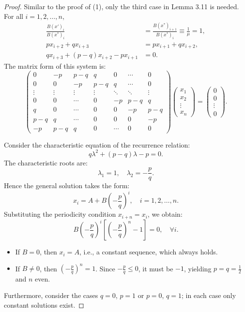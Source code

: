 \documentclass[a4paper,fleqn,numbers]{cas-sc}
\begin{document}
\begin{proof}
		Similar to the proof of (1), only the third case in Lemma 3.11 is needed. For all \(i=1,2,\ldots,n\),
		\begin{align*}
			\frac{B(x')_i}{B(x^*)_i}&=\frac{B(x^*)_{i+1}}{B(x^*)_i}\equiv\frac{1}{\mu}=1,\\
			p x_{i+2}+q x_{i+3}&=p x_{i+1}+q x_{i+2},\\
			q x_{i+3}+(p-q)x_{i+2}-p x_{i+1}&=0.
		\end{align*}
		The matrix form of this system is:
		\[
		\begin{pmatrix}
			0 & -p & p-q & q & 0 & \cdots & 0 \\
			0 & 0 & -p & p-q & q & \cdots & 0 \\
			\vdots & \vdots & \vdots & \vdots & \ddots & \ddots & \vdots \\
			0 & 0 & \cdots & 0 & -p & p-q & q \\
			q & 0 & \cdots & 0 & 0 & -p & p-q \\
			p-q & q & \cdots & 0 & 0 & 0 & -p \\
			-p & p-q & q & 0 & \cdots & 0 & 0
		\end{pmatrix}
		\begin{pmatrix}
			x_1 \\ x_2 \\ \vdots \\ x_n
		\end{pmatrix}
		=
		\begin{pmatrix}
			0 \\ 0 \\ \vdots \\ 0
		\end{pmatrix}.
		\]
		
		Consider the characteristic equation of the recurrence relation:
		\[
		q \lambda^2 + (p-q) \lambda - p = 0.
		\]
		The characteristic roots are:
		\[
		\lambda_1 = 1, \quad \lambda_2 = -\frac{p}{q}.
		\]
		Hence the general solution takes the form:
		\[
		x_i = A + B \left( -\frac{p}{q} \right)^i, \quad i=1,2,\ldots,n.
		\]
		Substituting the periodicity condition \(x_{i+n}=x_i\), we obtain:
		\[
		B \left( -\frac{p}{q} \right)^i \left[ \left( -\frac{p}{q} \right)^n - 1 \right] = 0, \quad \forall i.
		\]
		\begin{itemize}
			\item If \(B=0\), then \(x_i = A\), i.e., a constant sequence, which always holds.
			\item If \(B \neq 0\), then \(\left( -\frac{p}{q} \right)^n = 1\). Since \(-\frac{p}{q}\leq 0\), it must be \(-1\), yielding \(p=q=\frac{1}{2}\) and \(n\) even.
		\end{itemize}
		Furthermore, consider the cases \(q=0\), \(p=1\) or \(p=0\), \(q=1\); in each case only constant solutions exist.
		

\end{proof}
\end{document}
